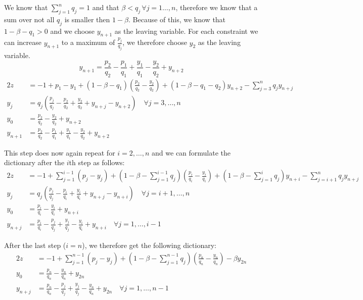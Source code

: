 \documentclass[a4paper,12pt,headsepline]{scrartcl}
\begin{document}
We know that $\sum_{j=1}^n q_j = 1$ and that $\beta<q_j\,\forall j=1\dots,n$, therefore we know that a sum over not all $q_j$ is smaller then $1-\beta$.
Because of this, we know that $1-\beta-q_1>0$ and we choose $y_{n+1}$ as the leaving variable.
For each constraint we can increase $y_{n+1}$ to a maximum of $\frac{p_j}{q_j}$, we therefore choose $y_2$ as the leaving variable.
\[ y_{n+1} = \frac{p_2}{q_2}-\frac{p_1}{q_1}+\frac{y_1}{q_1}-\frac{y_2}{q_2}+y_{n+2} \]
\begin{alignat*}{2}
  z       &= -1 + p_1 - y_1 + (1-\beta-q_1)(\frac{p_2}{q_2} - \frac{y_2}{q_2}) + (1-\beta-q_1-q_2)y_{n+2} - \sum_{j=3}^n q_jy_{n+j} \\
	y_j     &= q_j\left(\frac{p_j}{q_j}-\frac{p_2}{q_2}+\frac{y_2}{q_2}+y_{n+j}-y_{n+2}\right) \quad\forall j=3,\dots,n \\
	y_0     &= \frac{p_2}{q_2}-\frac{y_2}{q_2}+y_{n+2} \\
	y_{n+1} &= \frac{p_2}{q_2}-\frac{p_1}{q_1}+\frac{y_1}{q_1}-\frac{y_2}{q_2}+y_{n+2}
\end{alignat*}

This step does now again repeat for $i=2,\dots,n$ and we can formulate the dictionary after the $i$th step as follows:
\begin{alignat*}{2}
  z       &= -1 + \sum_{j=1}^{i-1} \left(p_j - y_j\right) + (1-\beta-\sum_{j=1}^{i-1} q_j)(\frac{p_i}{q_i} - \frac{y_i}{q_i}) + (1-\beta-\sum_{j=1}^i q_j)y_{n+i} - \sum_{j=i+1}^n q_jy_{n+j} \\
	y_j     &= q_j\left(\frac{p_j}{q_j}-\frac{p_i}{q_i}+\frac{y_i}{q_i}+y_{n+j}-y_{n+i}\right) \quad\forall j=i+1,\dots,n \\
	y_0     &= \frac{p_i}{q_i}-\frac{y_i}{q_i}+y_{n+i} \\
	y_{n+j} &= \frac{p_i}{q_i}-\frac{p_j}{q_j}+\frac{y_j}{q_j}-\frac{y_i}{q_i}+y_{n+i} \quad\forall j=1,\dots,i-1
\end{alignat*}

After the last step ($i=n$), we therefore get the following dictionary:
\begin{alignat*}{2}
  z       &= -1 + \sum_{j=1}^{n-1} \left(p_j - y_j\right) + (1-\beta-\sum_{j=1}^{n-1} q_j)(\frac{p_n}{q_n} - \frac{y_n}{q_n}) -\beta y_{2n} \\
	y_0     &= \frac{p_n}{q_n}-\frac{y_n}{q_n}+y_{2n} \\
	y_{n+j} &= \frac{p_n}{q_n}-\frac{p_j}{q_j}+\frac{y_j}{q_j}-\frac{y_n}{q_n}+y_{2n} \quad\forall j=1,\dots,n-1
\end{alignat*}
\end{document}
